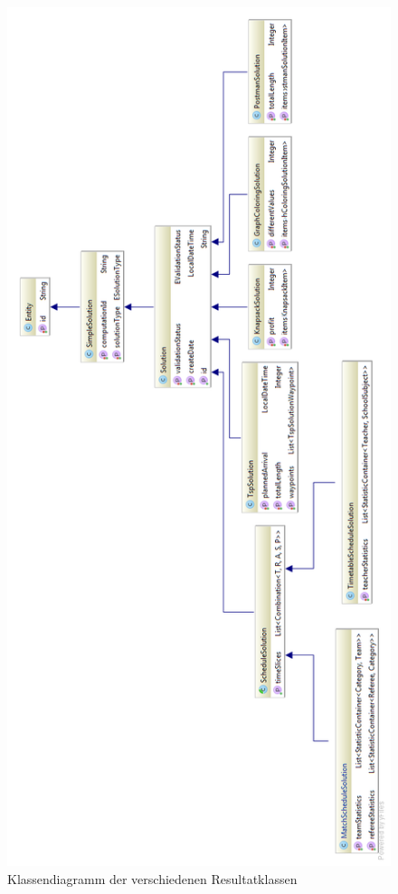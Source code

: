 \begin{figure}[h]
\centering
\includegraphics[scale=0.6]{images/solutions_diagramm.png}
\caption[Klassendiagramm der verschiedenen Resultatklassen]{Klassendiagramm der verschiedenen Resultatklassen \selfmade{}}
\label{fig:solutions_diagramm}
\end{figure}
